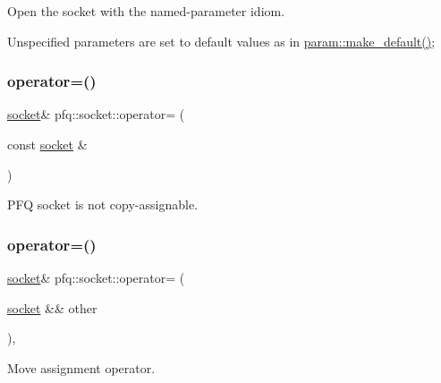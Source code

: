 Open the socket with the named-\/parameter idiom. 

Unspecified parameters are set to default values as in \hyperlink{namespacepfq_1_1param_af1fd1aeb980688527db587b35f55abf2}{param\+::make\+\_\+default()}; \mbox{\label{classpfq_1_1socket_a3cfd9674358a2ffd8b37e76d73b8a654}} 
\subsubsection{\texorpdfstring{operator=()}{operator=()}\hspace{0.1cm}{\footnotesize\ttfamily [1/2]}}
{\footnotesize\ttfamily \hyperlink{classpfq_1_1socket}{socket}\& pfq\+::socket\+::operator= (\begin{DoxyParamCaption}\item[{const \hyperlink{classpfq_1_1socket}{socket} \&}]{ }\end{DoxyParamCaption})\hspace{0.3cm}{\ttfamily [delete]}}



P\+FQ socket is not copy-\/assignable. 

\mbox{\label{classpfq_1_1socket_a8022eafa68b84a840292ebcfc4d1ba7a}} 
\subsubsection{\texorpdfstring{operator=()}{operator=()}\hspace{0.1cm}{\footnotesize\ttfamily [2/2]}}
{\footnotesize\ttfamily \hyperlink{classpfq_1_1socket}{socket}\& pfq\+::socket\+::operator= (\begin{DoxyParamCaption}\item[{\hyperlink{classpfq_1_1socket}{socket} \&\&}]{other }\end{DoxyParamCaption})\hspace{0.3cm}{\ttfamily [inline]}, {\ttfamily [noexcept]}}



Move assignment operator. 

\mbox{\label{classpfq_1_1socket_ad8ce551ea07f39317bb383ab88d66344}} 
